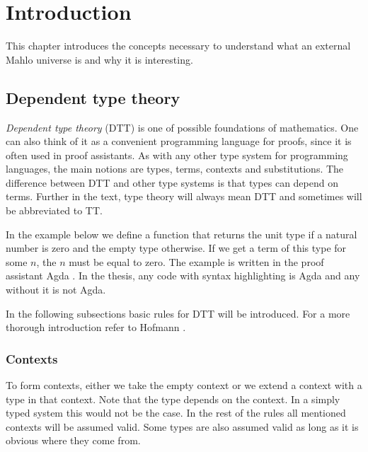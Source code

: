 \chapter{Introduction}

This chapter introduces the concepts necessary to understand what an external Mahlo universe is and why it is interesting.

\section{Dependent type theory}

\emph{Dependent type theory} (DTT) \cite{martin2021intuitionistic} is one of possible foundations of mathematics. One can also think of it as a convenient programming language for proofs, since it is often used in proof assistants. As with any other type system for programming languages, the main notions are types, terms, contexts and substitutions. The difference between DTT and other type systems is that types can depend on terms. Further in the text, type theory will always mean DTT and sometimes will be abbreviated to TT.

In the example below we define a function that returns the unit type if a natural number is zero and the empty type otherwise. If we get a term of this type for some $n$, the $n$ must be equal to zero. The example is written in the proof assistant Agda \cite{norell2009dependently}. In the thesis, any code with syntax highlighting is Agda and any without it is not Agda.



In the following subsections basic rules for DTT will be introduced. For a more thorough introduction refer to Hofmann \cite{hofmann1997syntax}.

\subsection{Contexts}


To form contexts, either we take the empty context or we extend a context with a type in that context. Note that the type depends on the context. In a simply typed system this would not be the case. In the rest of the rules all mentioned contexts will be assumed valid. Some types are also assumed valid as long as it is obvious where they come from.

